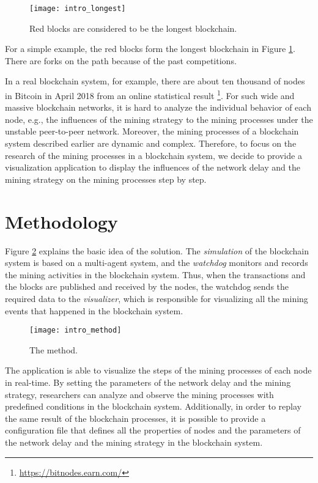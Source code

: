 \begin{figure}[htb]
    \centering
    \texttt{[image: intro\_longest]}
    \caption{Red blocks are considered to be the longest blockchain.}
    \label{fig:red blocks are considered to be the longest blockchain}
\end{figure}

For a simple example, the red blocks form the longest blockchain in Figure \ref{fig:red blocks are considered to be the longest blockchain}. There are forks on the path because of the past competitions.

In a real blockchain system, for example, there are about ten thousand of nodes in Bitcoin in April 2018 from an online statistical result \footnote{\url{https://bitnodes.earn.com/}}. For such wide and massive blockchain networks, it is hard to analyze the individual behavior of each node, e.g., the influences of the mining strategy to the mining processes under the unstable peer-to-peer network. Moreover, the mining processes of a blockchain system described earlier are dynamic and complex. Therefore, to focus on the research of the mining processes in a blockchain system, we decide to provide a visualization application to display the influences of the network delay and the mining strategy on the mining processes step by step.

\section{Methodology}

Figure \ref{fig:the method} explains the basic idea of the solution. The \textit{simulation} of the blockchain system is based on a multi-agent system, and the \textit{watchdog} monitors and records the mining activities in the blockchain system. Thus, when the transactions and the blocks are published and received by the nodes, the watchdog sends the required data to the \textit{visualizer}, which is responsible for visualizing all the mining events that happened in the blockchain system. 

\begin{figure}[htb]
    \centering
    \texttt{[image: intro\_method]}
    \caption{The method.}
    \label{fig:the method}
\end{figure}

The application is able to visualize the steps of the mining processes of each node in real-time. By setting the parameters of the network delay and the mining strategy, researchers can analyze and observe the mining processes with predefined conditions in the blockchain system. Additionally, in order to replay the same result of the blockchain processes, it is possible to provide a configuration file that defines all the properties of nodes and the parameters of the network delay and the mining strategy in the blockchain system.

